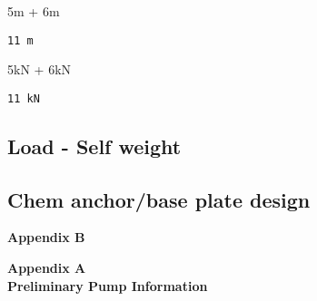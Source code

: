 \documentclass[
  11pt,
  letterpaper,
  DIV=11,
  numbers=noendperiod]{scrartcl}
\newenvironment{Shaded}{\begin{snugshade}}{\end{snugshade}}
\newcommand{\FloatTok}[1]{\textcolor[rgb]{0.68,0.00,0.00}{#1}}
\newcommand{\NormalTok}[1]{\textcolor[rgb]{0.00,0.23,0.31}{#1}}
\newcommand{\OperatorTok}[1]{\textcolor[rgb]{0.37,0.37,0.37}{#1}}
\newcommand{\appendixHeader}[1]{
     \begin{center}
     \vspace*{1cm}
     \textbf{\fontsize{24pt}{30pt}\selectfont #1} \\
     \end{center}
  }
\begin{document}
\begin{Shaded}
\begin{Highlighting}[]
\FloatTok{5}\NormalTok{m }\OperatorTok{+} \FloatTok{6}\NormalTok{m}
\end{Highlighting}
\end{Shaded}

\begin{verbatim}
11 m
\end{verbatim}

\begin{Shaded}
\begin{Highlighting}[]
\FloatTok{5}\NormalTok{kN }\OperatorTok{+} \FloatTok{6}\NormalTok{kN}
\end{Highlighting}
\end{Shaded}

\begin{verbatim}
11 kN
\end{verbatim}

\subsection{Load - Self weight}\label{load---self-weight}

\newpage{}

\subsection{Chem anchor/base plate
design}\label{chem-anchorbase-plate-design}



\newpage{}

\appendixHeader{Appendix B}

\newpage{}

\appendixHeader{Appendix A  \\ Preliminary Pump Information}
\end{document}
